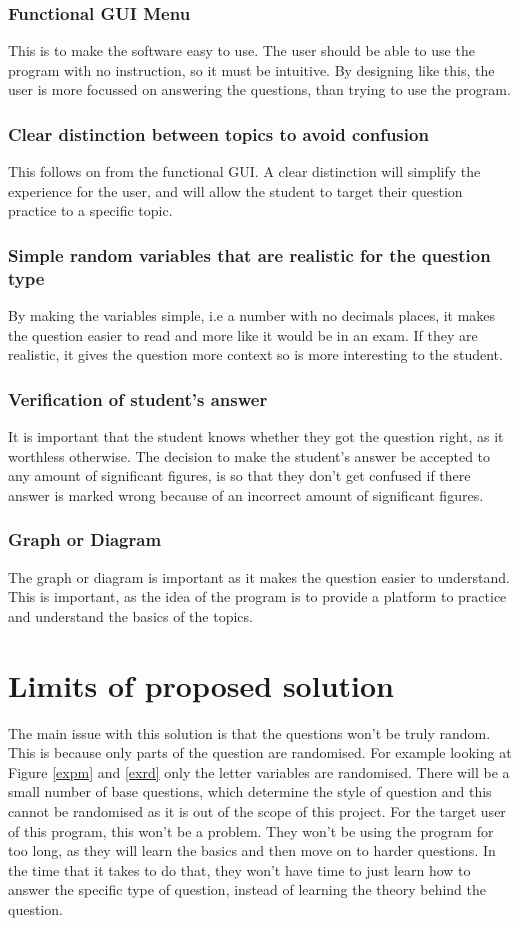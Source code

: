 \subsubsection{Functional GUI Menu}
This is to make the software easy to use. The user should be able to use the program with no instruction, so it must be intuitive. By designing like this, the user is more focussed on answering the questions, than trying to use the program.
\subsubsection{Clear distinction between topics to avoid confusion}
This follows on from the functional GUI.  A clear distinction will simplify the experience for the user, and will allow the student to target their question practice to a specific topic.
\subsubsection{Simple random variables that are realistic for the question type}
By making the variables simple, i.e a number with no decimals places, it makes the question easier to read and more like it would be in an exam. If they are realistic, it gives the question more context so is more interesting to the student.
\subsubsection{Verification of student's answer}
It is important that the student knows whether they got the question right, as it worthless otherwise. The decision to make the student's answer be accepted to any amount of significant figures, is so that they don't get confused if there answer is marked wrong because of an incorrect amount of significant figures.
\subsubsection{Graph or Diagram}
The graph or diagram is important as it makes the question easier to understand. This is important, as the idea of the program is to provide a platform to practice and understand the basics of the topics.

\section{Limits of proposed solution}
The main issue with this solution is that the questions won't be truly random. This is because only parts of the question are randomised. For example looking at Figure \ref{expm} and \ref{exrd} only the letter variables are randomised. There will be a small number of base questions, which determine the style of question and this cannot be randomised as it is out of the scope of this project. For the target user of this program, this won't be a problem. They won't be using the program for too long, as they will learn the basics and then move on to harder questions. In the time that it takes to do that, they won't have time to just learn how to answer the specific type of question, instead of learning the theory behind the question.

